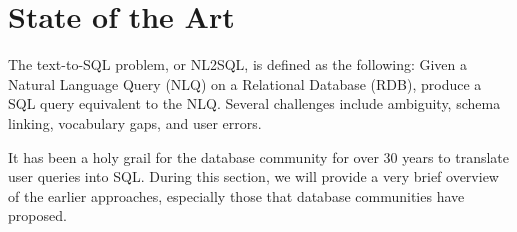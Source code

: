 

\section{State of the Art}

The text-to-SQL problem, or NL2SQL, is defined as the following: Given a Natural Language Query (NLQ) on a Relational Database (RDB), produce a SQL query equivalent to the NLQ. Several challenges include ambiguity, schema linking, vocabulary gaps, and user errors.

It has been a holy grail for the database community for over 30 years to translate user queries into SQL. During this section, we will provide a very brief overview of the earlier approaches, especially those that database communities have proposed.
